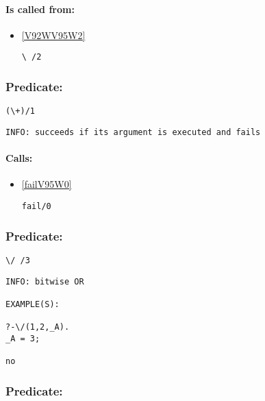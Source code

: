 \paragraph{Is called from:} 
\begin{itemize}
\item \ref{V92WV95W2} 
\begin{verbatim}
\ /2
\end{verbatim}

\end{itemize}

\subsubsection{Predicate:} \label{V92WV43WV95W1}

\begin{verbatim}
(\+)/1
\end{verbatim}

{\small \begin{verbatim}
INFO: succeeds if its argument is executed and fails

\end{verbatim}}
\paragraph{Calls:} 
\begin{itemize}
\item \ref{failV95W0} 
\begin{verbatim}
fail/0
\end{verbatim}

\end{itemize}

\subsubsection{Predicate:} \label{V92WV47WV95W3}

\begin{verbatim}
\/ /3
\end{verbatim}

{\small \begin{verbatim}
INFO: bitwise OR

EXAMPLE(S):

?-\/(1,2,_A).
_A = 3;

no

\end{verbatim}}

\subsubsection{Predicate:} \label{V92WV61WV95W2}

